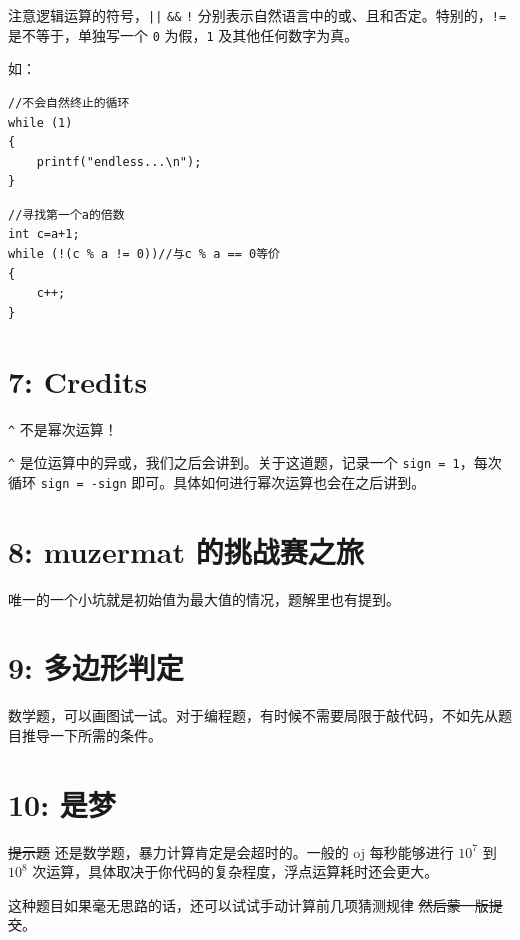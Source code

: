 \documentclass[UTF8]{ctexart}
\newcommand{\code}[1]{\colorbox{gray!10}{\texttt{#1}}}
\begin{document}
注意逻辑运算的符号，\code{||} \code{\&\&} \code{!} 分别表示自然语言中的或、且和否定。特别的，\code{!=} 是不等于，单独写一个 \code{0} 为假，\code{1} 及其他任何数字为真。

如：

\begin{lstlisting}
//不会自然终止的循环
while (1)
{
    printf("endless...\n");
}
\end{lstlisting}

\begin{lstlisting}
//寻找第一个a的倍数
int c=a+1;
while (!(c % a != 0))//与c % a == 0等价
{
    c++;
}
\end{lstlisting}

\section*{7: Credits}

\code{\^} 不是幂次运算！

\code{\^} 是位运算中的异或，我们之后会讲到。关于这道题，记录一个 \code{sign = 1}，每次循环 \code{sign = -sign} 即可。具体如何进行幂次运算也会在之后讲到。

\section*{8: muzermat 的挑战赛之旅}

唯一的一个小坑就是初始值为最大值的情况，题解里也有提到。

\section*{9: 多边形判定}

数学题，可以画图试一试。对于编程题，有时候不需要局限于敲代码，不如先从题目推导一下所需的条件。

\section*{10: 是梦}

\sout{提示题} 还是数学题，暴力计算肯定是会超时的。一般的 oj 每秒能够进行 \(10^7\) 到 \(10^8\) 次运算，具体取决于你代码的复杂程度，浮点运算耗时还会更大。

这种题目如果毫无思路的话，还可以试试手动计算前几项猜测规律 \sout{然后蒙一版提交}。
\end{document}
